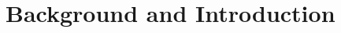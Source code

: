 \documentclass[11pt,a4paper,onecolumn]{IEEEtran}
\title{}
\author{}
\begin{document}
	
\section{Background and Introduction}

\end{document}
